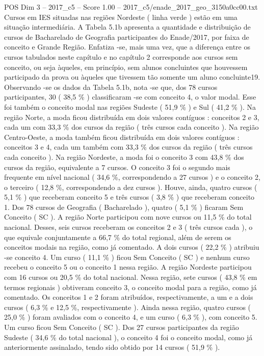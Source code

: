 \begin{textsample}{POS Dim 3 – 2017\_c5 – Score 1.00 – 2017\_c5/enade\_2017\_geo\_3150a0cc00.txt}
Cursos em IES situadas nas regiões Nordeste ( linha verde ) estão em uma situação intermediária.
A Tabela 5.1b apresenta a quantidade e distribuição de cursos de Bacharelado de Geografia participantes do Enade/2017, por faixa de conceito e Grande Região.
Enfatiza -se, mais uma vez, que a diferença entre os cursos tabulados neste capítulo e no capítulo 2 corresponde aos cursos sem conceito, ou seja àqueles, em princípio, sem alunos concluintes que houvessem participado da prova ou àqueles que tivessem tão somente um aluno concluinte19.
Observando -se os dados da Tabela 5.1b, nota -se que, dos 78 cursos participantes, 30 ( 38,5 \% ) classificaram -se com conceito 4, o valor modal.
Esse foi também o conceito modal nas regiões Sudeste ( 51,9 \% ) e Sul ( 41,2 \% ).
Na região Norte, a moda ficou distribuída em dois valores contíguos : conceitos 2 e 3, cada um com 33,3 \% dos cursos da região ( três cursos cada conceito ).
Na região Centro-Oeste, a moda também ficou distribuída em dois valores contíguos : conceitos 3 e 4, cada um também com 33,3 \% dos cursos da região ( três cursos cada conceito ).
Na região Nordeste, a moda foi o conceito 3 com 43,8 \% dos cursos da região, equivalente a 7 cursos.
O conceito 3 foi o segundo mais frequente em nível nacional ( 34,6 \%, correspondendo a 27 cursos ) e o conceito 2, o terceiro ( 12,8 \%, correspondendo a dez cursos ).
Houve, ainda, quatro cursos ( 5,1 \% ) que receberam conceito 5 e três cursos ( 3,8 \% ) que receberam conceito 1.
Dos 78 cursos de Geografia ( Bacharelado ), quatro ( 5,1 \% ) ficaram Sem Conceito ( SC ).
A região Norte participou com nove cursos ou 11,5 \% do total nacional.
Desses, seis cursos receberam os conceitos 2 e 3 ( três cursos cada ), o que equivale conjuntamente a 66,7 \% do total regional, além de serem os conceitos modais na região, como já comentado.
A dois cursos ( 22,2 \% ) atribuiu -se conceito 4.
Um curso ( 11,1 \% ) ficou Sem Conceito ( SC ) e nenhum curso recebeu o conceito 5 ou o conceito 1 nessa região.
A região Nordeste participou com 16 cursos ou 20,5 \% do total nacional.
Nessa região, sete cursos ( 43,8 \% em termos regionais ) obtiveram conceito 3, o conceito modal para a região, como já comentado.
Os conceitos 1 e 2 foram atribuídos, respectivamente, a um e a dois cursos ( 6,3 \% e 12,5 \%, respectivamente ).
Ainda nessa região, quatro cursos ( 25,0 \% ) foram avaliados com o conceito 4, e um curso ( 6,3 \% ), com conceito 5.
Um curso ficou Sem Conceito ( SC ).
Dos 27 cursos participantes da região Sudeste ( 34,6 \% do total nacional ), o conceito 4 foi o conceito modal, como já anteriormente assinalado, tendo sido obtido por 14 cursos ( 51,9 \% ).

\end{textsample}
